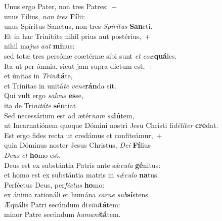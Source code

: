 \oddverse Unus ergo Pater, non tres Patres:~+\\
\oddverse  unus Fílius, \textit{non} \textit{tres} \textbf{Fí}lii:~\*\\
\oddverse unus Spíritus Sanctus, non tres \textit{Spí}\textit{ri}\textit{tus} \textbf{San}cti.\\
\evenverse Et in hac Trinitáte nihil prius aut postérius,~+\\
\evenverse  nihil ma\textit{jus} \textit{aut} \textbf{mi}nus:~\*\\
\evenverse sed totæ tres persónæ coætérnæ sibi sunt \textit{et} \textit{co}\textit{æ}\textbf{quá}les.\\
\oddverse Ita ut per ómnia, sicut jam supra dictum est,~+\\
\oddverse  et únitas in \textit{Tri}\textit{ni}\textbf{tá}te,~\*\\
\oddverse et Trínitas in unitá\textit{te} \textit{ve}\textit{ne}\textbf{rán}da sit.\\
\evenverse Qui vult ergo \textit{sal}\textit{vus} \textbf{es}se,~\*\\
\evenverse ita de Tri\textit{ni}\textit{tá}\textit{te} \textbf{sén}tiat.\\
\oddverse Sed necessárium est ad ætér\textit{nam} \textit{sa}\textbf{lú}tem,~\*\\
\oddverse ut Incarnatiónem quoque Dómini nostri Jesu Christi fi\textit{dé}\textit{li}\textit{ter} \textbf{cre}dat.\\
\evenverse Est ergo fides recta ut credámus et confiteámur,~+\\
\evenverse  quia Dóminus noster Jesus Christus, \textit{De}\textit{i} \textbf{Fí}lius~\*\\
\evenverse \textit{De}\textit{us} \textit{et} \textbf{ho}mo est.\\
\oddverse Deus est ex substántia Patris ante sǽ\textit{cu}\textit{la} \textbf{gé}nitus:~\*\\
\oddverse et homo est ex substántia matris in \textit{sǽ}\textit{cu}\textit{lo} \textbf{na}tus.\\
\evenverse Perféctus Deus, per\textit{fé}\textit{ctus} \textbf{ho}mo:~\*\\
\evenverse ex ánima rationáli et humána \textit{car}\textit{ne} \textit{sub}\textbf{sí}stens.\\
\oddverse Æquális Patri secúndum di\textit{vi}\textit{ni}\textbf{tá}tem:~\*\\
\oddverse minor Patre secúndum \textit{hu}\textit{ma}\textit{ni}\textbf{tá}tem.\\
